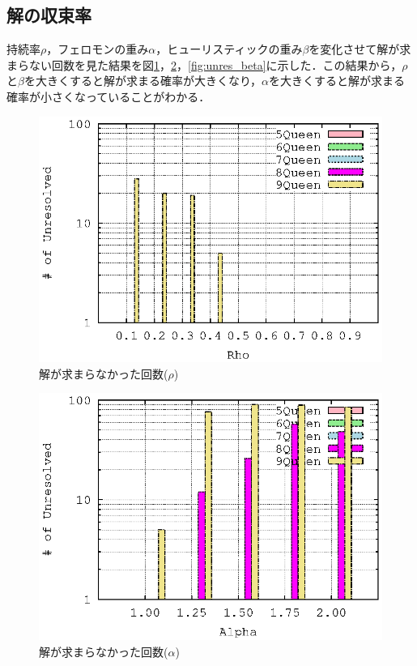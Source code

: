 \documentclass{jarticle}
\begin{document}
\subsection{解の収束率}
持続率$\rho$，フェロモンの重み$\alpha$，ヒューリスティックの重み$\beta$を変化させて解が求まらない回数を見た結果を図\ref{fig:unres_rho}，\ref{fig:unres_alpha}，\ref{fig:unres_beta}に示した．この結果から，$\rho$と$\beta$を大きくすると解が求まる確率が大きくなり，$\alpha$を大きくすると解が求まる確率が小さくなっていることがわかる．
\begin{figure}[H]
\begin{center}
	\includegraphics[width=120mm]{image/unresolved_rho.eps}
	\caption{解が求まらなかった回数($\rho$)}
	\label{fig:unres_rho}
\end{center}
\end{figure}
\begin{figure}[H]
\begin{center}
	\includegraphics[width=120mm]{image/unresolved_alpha.eps}
	\caption{解が求まらなかった回数($\alpha$)}
	\label{fig:unres_alpha}
\end{center}
\end{figure}
\end{document}
